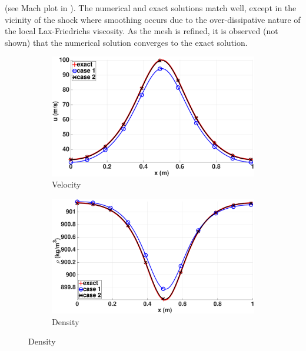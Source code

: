 (see Mach plot in ). The numerical and exact solutions match  well, except in the vicinity of the shock where smoothing occurs due to the over-dissipative nature of the local Lax-Friedrichs viscosity. As the mesh is refined, it is observed (not shown) that the numerical solution converges to the exact solution. %
%
\begin{figure}[H]
        \centering
        \begin{subfigure}[b]{0.5\textwidth}
                \centering
                \includegraphics[width=\textwidth]{figures/liquid_velocity_llf_and_exact_100.eps}
                \caption{Velocity}
                \label{fig:liq-phase-vel}
        \end{subfigure}%
        \begin{subfigure}[b]{0.5\textwidth}
                \centering
                \includegraphics[width=\textwidth]{figures/liquid_density_llf_and_exact_100.eps}
                \caption{Density}
                \label{fig:liq-phase-density}
        \end{subfigure}
        

\end{figure}
